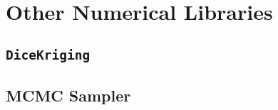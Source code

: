 \chapter{Other Numerical Libraries}\label{app:num_libs}

\section{\texttt{DiceKriging}}\label{sec:dice_kriging}

\section{MCMC Sampler}\label{sec:mcmc_sampler}

